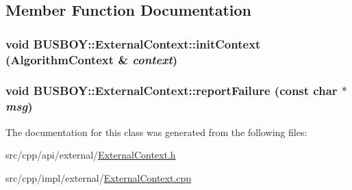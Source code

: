 \subsection{Member Function Documentation}
\hypertarget{classBUSBOY_1_1ExternalContext_a2d7098419637591cd82f44c7c4bed1e5}{
\subsubsection[{initContext}]{\setlength{\rightskip}{0pt plus 5cm}void BUSBOY::ExternalContext::initContext ({\bf AlgorithmContext} \& {\em context})}}
\label{classBUSBOY_1_1ExternalContext_a2d7098419637591cd82f44c7c4bed1e5}
\hypertarget{classBUSBOY_1_1ExternalContext_a5f70d1baeba3e1de1b9fb089ebafd6d0}{
\subsubsection[{reportFailure}]{\setlength{\rightskip}{0pt plus 5cm}void BUSBOY::ExternalContext::reportFailure (const char $\ast$ {\em msg})}}
\label{classBUSBOY_1_1ExternalContext_a5f70d1baeba3e1de1b9fb089ebafd6d0}


The documentation for this class was generated from the following files:\begin{DoxyCompactItemize}
\item 
src/cpp/api/external/\hyperlink{ExternalContext_8h}{ExternalContext.h}\item 
src/cpp/impl/external/\hyperlink{ExternalContext_8cpp}{ExternalContext.cpp}\end{DoxyCompactItemize}

